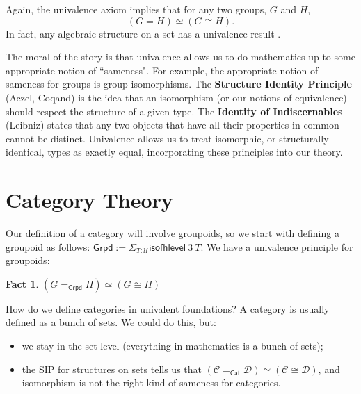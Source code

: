 \documentclass{amsart}
\theoremstyle{definition}
\newtheorem*{fact}{Fact}
\newcommand{\Cat}{\ensuremath{\mathsf{Cat}}}
\newcommand{\isofhlevel}[2]{\ensuremath{\mathsf{isofhlevel}~#1~#2}}
\newcommand{\Grpd}{\ensuremath{\mathsf{Grpd}}}
\newcommand{\U}{\ensuremath{\mathcal{U}}}
\begin{document}

Again, the univalence axiom implies that for any two groups, $G$ and $H$,
\[(G = H)\simeq (G \cong H).\]
In fact, any algebraic structure on a set has a univalence result \cite{coq:isomorphism-is-equality}.


The moral of the story is that univalence allows us to do mathematics up to some appropriate notion of ``sameness".
For example, the appropriate notion of sameness for groups is group isomorphisms.
The \textbf{Structure Identity Principle} (Aczel, Coqand) is the idea that an isomorphism (or our notions of equivalence) should respect the structure of a given type.
The \textbf{Identity of Indiscernables} (Leibniz) states that any two objects that have all their properties in common cannot be distinct.
Univalence allows us to treat isomorphic, or structurally identical, types as exactly equal, incorporating these principles into our theory.

\section{Category Theory}

Our definition of a category will involve groupoids, so we start with defining a groupoid as follows: $\Grpd:= \Sigma_{T:\U} \isofhlevel{3}{T}$. We have a univalence principle for groupoids:

\begin{fact}
    $(G=_{\Grpd}H) \simeq (G\cong H)$
\end{fact}

How do we define categories in univalent foundations? A category is usually defined as a bunch of sets. We could do this, but:

\begin{itemize}
    \item we stay in the set level (everything in mathematics is a bunch of sets);
    \item the SIP for structures on sets tells us that $(\mathcal C =_{\Cat} \mathcal D) \simeq (\mathcal C \cong \mathcal D)$, and isomorphism is not the right kind of sameness for categories.
\end{itemize}
\end{document}
